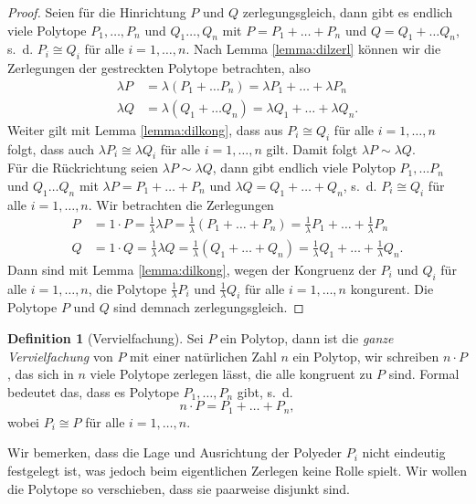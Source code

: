 \documentclass[11pt,titlepage]{article}
\theoremstyle{definition}
\newtheorem{definition}[theorem]{Definition}
\theoremstyle{remark}
\begin{document}
	\begin{proof}
		Seien für die Hinrichtung $P$ und $Q$ zerlegungsgleich, dann gibt 
		es endlich viele Polytope $P_1,\ldots,P_n$ und $Q_1\ldots,Q_n$ mit 
		$P=P_1+\ldots+P_n$ und $Q=Q_1+\ldots Q_n$, s.~d. $P_i\cong Q_i$ 
		für alle $i=1,\ldots, n$. Nach Lemma \ref{lemma:dilzerl} können wir 
		die Zerlegungen der gestreckten Polytope betrachten, also
		\begin{align*}
			\lambda P&=\lambda (P_1+\ldots P_n)=\lambda P_1 +\ldots+\lambda P_n \\
			\lambda Q&=\lambda (Q_1+\ldots Q_n)=\lambda Q_1 +\ldots+\lambda Q_n.
		\end{align*}
		Weiter gilt mit Lemma \ref{lemma:dilkong}, dass aus $P_i\cong Q_i$ 
		für alle $i=1,\ldots,n$ folgt, dass auch $\lambda P_i\cong\lambda Q_i$ 
		für alle $i=1,\ldots,n$ gilt. Damit folgt $\lambda P\sim \lambda Q$. \\
		Für die Rückrichtung seien $\lambda P\sim \lambda Q$, dann gibt 
		endlich viele Polytop $P_1,\ldots P_n$ und $Q_1\ldots Q_n$ mit 
		$\lambda P=P_1+\ldots+P_n$ und $\lambda Q=Q_1+\ldots+Q_n$, s.~d. 
		$P_i\cong Q_i$ für alle $i=1,\ldots,n$. Wir betrachten die 
		Zerlegungen
		\begin{align*}
			P&=1\cdot P=\frac{1}{\lambda}\lambda P=\frac{1}{\lambda}(P_1+\ldots+P_n)
			=\frac{1}{\lambda}P_1+\ldots+\frac{1}{\lambda}P_n \\
			Q&=1\cdot Q=\frac{1}{\lambda}\lambda Q=\frac{1}{\lambda}(Q_1+\ldots+Q_n)
			=\frac{1}{\lambda}Q_1+\ldots+\frac{1}{\lambda}Q_n.
		\end{align*}
		Dann sind mit Lemma \ref{lemma:dilkong}, wegen der Kongruenz der $P_i$ und 
		$Q_i$ für alle $i=1,\ldots,n$, die Polytope $\frac{1}{\lambda}P_i$ und 
		$\frac{1}{\lambda}Q_i$ für alle $i=1,\ldots,n$ kongurent. 
		Die Polytope $P$ und $Q$ sind demnach zerlegungsgleich.
	\end{proof}
	
	\begin{definition}[Vervielfachung]
		Sei $P$ ein Polytop, dann ist die \textsl{ganze Vervielfachung} 
		von $P$ mit 
		einer natürlichen Zahl $n$ ein Polytop, wir schreiben $n\cdot P$, 
		das sich in $n$ viele Polytope zerlegen lässt, die alle kongruent zu 
		$P$ sind. Formal bedeutet das, dass es Polytope $P_1,\ldots,P_n$ gibt, s.~d.
		\[n\cdot P=P_1+\ldots+P_n,\]
		wobei $P_i\cong P$ für alle $i=1,\ldots,n$.
	\end{definition}
	
	Wir bemerken, dass die Lage und Ausrichtung der Polyeder $P_i$ nicht 
	eindeutig festgelegt 
	ist, was jedoch beim eigentlichen Zerlegen keine Rolle spielt. Wir wollen 
	die Polytope so verschieben, dass sie paarweise disjunkt sind.
	
\end{document}
